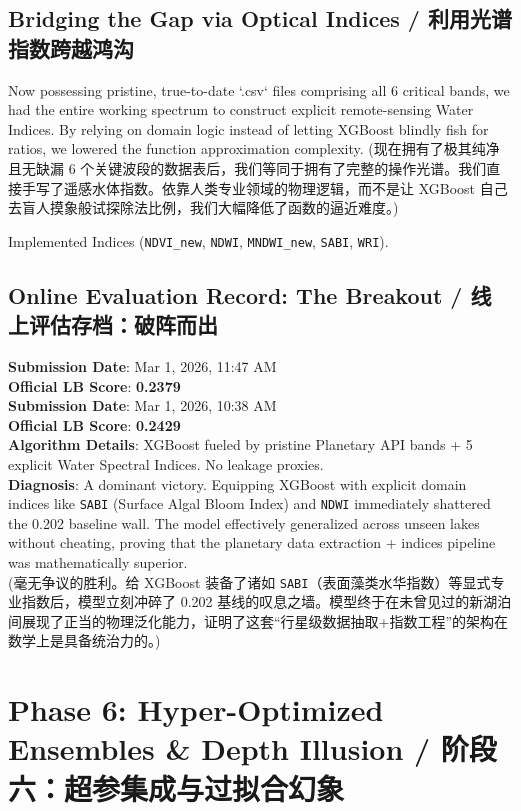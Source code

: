 \subsection{Bridging the Gap via Optical Indices / 利用光谱指数跨越鸿沟}
Now possessing pristine, true-to-date `.csv` files comprising all 6 critical bands, we had the entire working spectrum to construct explicit remote-sensing Water Indices. By relying on domain logic instead of letting XGBoost blindly fish for ratios, we lowered the function approximation complexity.
(现在拥有了极其纯净且无缺漏 6 个关键波段的数据表后，我们等同于拥有了完整的操作光谱。我们直接手写了遥感水体指数。依靠人类专业领域的物理逻辑，而不是让 XGBoost 自己去盲人摸象般试探除法比例，我们大幅降低了函数的逼近难度。)

Implemented Indices (\texttt{NDVI\_new}, \texttt{NDWI}, \texttt{MNDWI\_new}, \texttt{SABI}, \texttt{WRI}).

\subsection{Online Evaluation Record: The Breakout / 线上评估存档：破阵而出}
\begin{infobox}
\textbf{Submission Date}: Mar 1, 2026, 11:47 AM \\
\textbf{Official LB Score}: \textbf{0.2379} \\
\textbf{Submission Date}: Mar 1, 2026, 10:38 AM \\
\textbf{Official LB Score}: \textbf{0.2429} \\
\textbf{Algorithm Details}: XGBoost fueled by pristine Planetary API bands + 5 explicit Water Spectral Indices. No leakage proxies. \\
\textbf{Diagnosis}: A dominant victory. Equipping XGBoost with explicit domain indices like \texttt{SABI} (Surface Algal Bloom Index) and \texttt{NDWI} immediately shattered the 0.202 baseline wall. The model effectively generalized across unseen lakes without cheating, proving that the planetary data extraction + indices pipeline was mathematically superior. \\
(毫无争议的胜利。给 XGBoost 装备了诸如 \texttt{SABI}（表面藻类水华指数）等显式专业指数后，模型立刻冲碎了 0.202 基线的叹息之墙。模型终于在未曾见过的新湖泊间展现了正当的物理泛化能力，证明了这套“行星级数据抽取+指数工程”的架构在数学上是具备统治力的。)
\end{infobox}

\section{Phase 6: Hyper-Optimized Ensembles \& Depth Illusion / 阶段六：超参集成与过拟合幻象}

